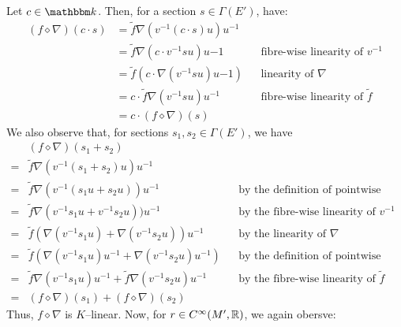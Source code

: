 \documentclass[./Thick_TQFTs_and_Quantum_Information.tex]{subfiles}
\begin{document}
Let $c \in \K$. Then, for a section $s \in \Gamma(E')$, have:
\begin{align*}
  (f \diamond \nabla)(c \cdot s)
    &= \tilde{f}\nabla(v^{-1}(c \cdot s)u)u^{-1} \\
    &= \tilde{f}\nabla(c \cdot v^{-1}su)u{-1}
      && \text{fibre-wise linearity of } v^{-1} \\
    &= \tilde{f} (c \cdot  \nabla(v^{-1}su)u{-1})
      && \text{linearity of } \nabla \\
    &= c \cdot \tilde{f}\nabla(v^{-1}su)u^{-1}
      && \text{fibre-wise linearity of } \tilde{f} \\
    &= c \cdot (f \diamond \nabla)(s)
\end{align*}
We also observe that, for sections $s_1, s_2 \in \Gamma(E')$, we have
\begin{align*}
   & (f \diamond \nabla)(s_1 + s_2)\\
  =& \tilde{f}\nabla(v^{-1}(s_1 + s_2)u)u^{-1} \\
  =& \tilde{f}\nabla(v^{-1}(s_1u + s_2u))u^{-1}
    && \text{by the definition of pointwise addition} \\
  =& \tilde{f}\nabla(v^{-1}s_1u + v^{-1}s_2u))u^{-1}
    && \text{by the fibre-wise linearity of } v^{-1} \\
  =& \tilde{f}(\nabla(v^{-1}s_1u)
    + \nabla(v^{-1}s_2u))u^{-1}
    && \text{by the linearity of } \nabla \\
  =& \tilde{f}(\nabla(v^{-1}s_1u)u^{-1}
    + \nabla(v^{-1}s_2u)u^{-1})
    && \text{by the definition of pointwise addition} \\
  =& \tilde{f}\nabla(v^{-1}s_1u)u^{-1}
    + \tilde{f}\nabla(v^{-1}s_2u)u^{-1}
    && \text{by the fibre-wise linearity of } \tilde{f} \\
  =& (f \diamond \nabla)(s_1) + (f \diamond \nabla)(s_2)
\end{align*}
Thus, $f \diamond \nabla$ is $K$--linear. Now, for $r \in C^{\infty}(M', \mathbb{R})$, we
again obersve:
\end{document}

